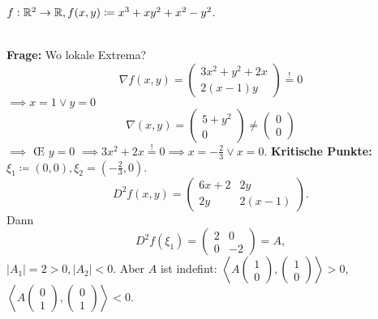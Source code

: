 \begin{example}
	$ f: \mathbb{R} ^2 \to \mathbb{R} , f(x, y) \coloneqq x^3 + xy^2 + x^2 - y^2 $.\\
	\\
	\textbf{Frage:} Wo lokale Extrema?
	\[
		\nabla f(x, y) = \begin{pmatrix} 3x^2 + y^2 + 2x \\ 2(x - 1)y \end{pmatrix} \overset{!}{=} 0
	\]
	$ \implies x = 1 \vee y = 0 $
	\[
		\nabla (x, y) = \begin{pmatrix} 5 + y^2 \\ 0 \end{pmatrix} \neq \begin{pmatrix} 0 \\ 0 \end{pmatrix}
	\]
	$ \implies  $ \OE{} $ y = 0 $ $ \implies 3x^2 + 2x \overset{!}{=} 0 \implies  x = - \frac{ 2 }{ 3 } \vee x = 0 $.
	\textbf{Kritische Punkte:} $ \xi_1 \coloneqq (0, 0), \xi_2 = \left( - \frac{ 2 }{ 3 } , 0 \right)  $.
	\[
		D^2 f (x, y) = \begin{pmatrix} 6x + 2 & 2y \\ 2y & 2(x - 1) \end{pmatrix} .
	\]
	Dann
	\[
		D^2f(\xi_1) = \begin{pmatrix} 2 & 0 \\ 0 & -2 \end{pmatrix} = A,
	\]
	$ \left| A_1 \right| = 2 > 0, \left| A_2 \right| < 0 $.
	Aber $ A $ ist indefint:
	$ \left< A \begin{pmatrix} 1 \\ 0 \end{pmatrix} , \begin{pmatrix} 1 \\ 0 \end{pmatrix}  \right> > 0$, $ \left< A \begin{pmatrix} 0 \\ 1 \end{pmatrix} , \begin{pmatrix} 0 \\ 1 \end{pmatrix}  \right> <0 $.

\end{example}

